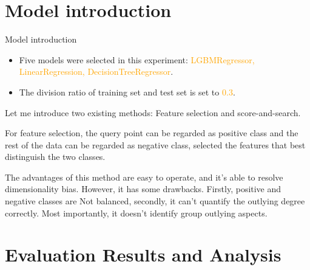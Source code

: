 \documentclass[
 size=14pt,
 paper=smartboard,  %
 mode=present, 		%
 display=slides, 	%
 style=tuliplab,  	%
 pauseslide,
 fleqn,leqno]{powerdot}
\begin{document}


\section{Model introduction}


\begin{slide}{Model introduction}
\begin{itemize}
\item
Five models were selected in this experiment: \textcolor{orange}{LGBMRegressor, LinearRegression, DecisionTreeRegressor}.

\item
The division ratio of training set and test set is set to \textcolor{orange}{0.3}.

\end{itemize}




\begin{note}
Let me introduce two existing methods:
Feature selection and score-and-search.

For feature selection,
the query point can be regarded as positive class and
the rest of the data can be regarded as negative class,
selected the features that best distinguish the two classes.

The advantages of this method are easy to operate,
and it's able to resolve dimensionality bias.
However, it has some drawbacks.
Firstly,
positive and negative classes are Not balanced,
secondly,
it can't quantify the outlying degree correctly.
Most importantly,
it doesn't identify group outlying aspects.
\end{note}

\end{slide}








\section{Evaluation Results and Analysis}
\end{document}
